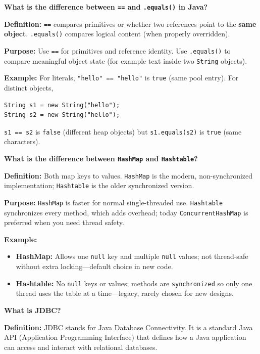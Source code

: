 \newpage

\question[0]
\textbf{What is the difference between \texttt{==} and \texttt{.equals()} in Java?}

\textbf{Definition:} \texttt{==} compares primitives or whether two references point to the \textbf{same object}. \texttt{.equals()} compares logical content (when properly overridden).

\textbf{Purpose:} Use \texttt{==} for primitives and reference identity. Use \texttt{.equals()} to compare meaningful object state (for example text inside two \texttt{String} objects).

\textbf{Example:} For literals, \texttt{"hello" == "hello"} is \texttt{true} (same pool entry). For distinct objects,
\begin{lstlisting}[style=java]
String s1 = new String("hello");
String s2 = new String("hello");
\end{lstlisting}
\texttt{s1 == s2} is \texttt{false} (different heap objects) but \texttt{s1.equals(s2)} is \texttt{true} (same characters).

\question[0]
\textbf{What is the difference between \texttt{HashMap} and \texttt{Hashtable}?}

\textbf{Definition:} Both map keys to values. \texttt{HashMap} is the modern, non-synchronized implementation; \texttt{Hashtable} is the older synchronized version.

\textbf{Purpose:} \texttt{HashMap} is faster for normal single-threaded use. \texttt{Hashtable} synchronizes every method, which adds overhead; today \texttt{ConcurrentHashMap} is preferred when you need thread safety.

\textbf{Example:}
\begin{itemize}
  \item \textbf{HashMap:} Allows one \texttt{null} key and multiple \texttt{null} values; not thread-safe without extra locking---default choice in new code.
  \item \textbf{Hashtable:} No \texttt{null} keys or values; methods are \texttt{synchronized} so only one thread uses the table at a time---legacy, rarely chosen for new designs.
\end{itemize}

\question[0]
\textbf{What is JDBC?}

\textbf{Definition:} JDBC stands for Java Database Connectivity. It is a standard Java API (Application Programming Interface) that defines how a Java application can access and interact with relational databases.

